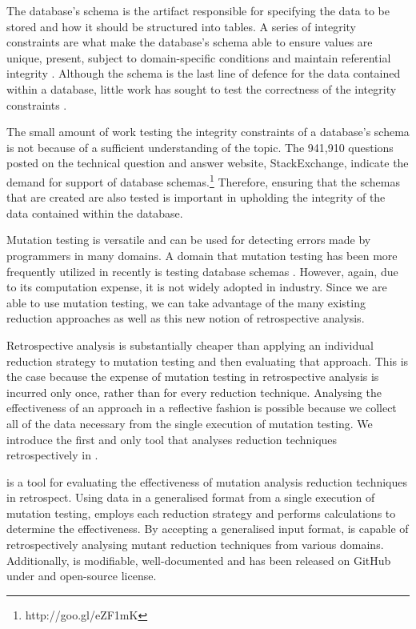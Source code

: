 The database's schema is the artifact responsible for specifying the data to be stored and
how it should be structured into tables. A series of integrity constraints
are what make the database's schema able to ensure values are unique, present,
subject to domain-specific conditions and maintain referential integrity \cite{mcminn2016virtual}.
Although the schema is the last line of defence for the data contained
within a database, little work has sought to test the correctness of the integrity constraints \cite{mcminn2015effectiveness}.



The small amount of work testing the integrity constraints of a database's schema is not
because of a sufficient understanding of the topic. The 941,910 questions posted on
the technical question and answer website, StackExchange, indicate the demand for support
of database schemas.\footnote{http://goo.gl/eZF1mK} Therefore, ensuring that
the schemas that are created are also tested is important in upholding the integrity
of the data contained within the database.

Mutation testing is versatile and can be used for detecting errors made by programmers in many domains.
A domain that mutation testing has been more frequently utilized in recently is testing database
schemas \cite{mcminn2016virtual, mcminn2015effectiveness, wright2013efficient}. However,
again, due to its computation expense, it is not widely adopted in industry. Since we
are able to use mutation testing, we can take advantage of the many
existing reduction approaches \cite{jia2011analysis, wong1995reducing, offutt1993experimental, offutt2001mutation}
as well as this new notion of retrospective analysis.

Retrospective analysis is substantially cheaper than applying an
individual reduction strategy to mutation testing and then evaluating that
approach. This is the case because the expense of mutation testing in
retrospective analysis is incurred only once, rather than for
every reduction technique. Analysing the effectiveness of an approach in a reflective fashion
is possible because we collect all of the data necessary from
the single execution of mutation testing. We introduce the
first and only tool that analyses reduction techniques retrospectively
in \mr.

\mr is a tool for evaluating the effectiveness of mutation analysis reduction techniques
in retrospect. Using data in a generalised format from a single execution of mutation testing, \mr
employs each reduction strategy and performs calculations to determine the
effectiveness. By accepting a generalised input format, \mr is capable of
retrospectively analysing mutant reduction techniques from various domains.
Additionally, \mr is modifiable, well-documented and has been released on
GitHub under and open-source license.


